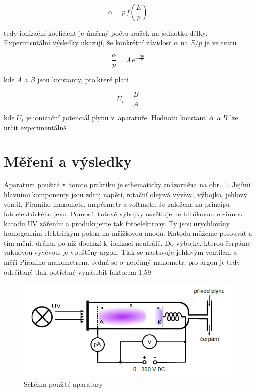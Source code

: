 \documentclass[a4paper,12pt]{article}
\newcommand{\e}{\text{e}}
\begin{document}
\begin{equation}
	\alpha = p\,f\left( \frac {E}{p} \right) 
	\label{4}
\end{equation}

tedy ionizační koeficient je úměrný počtu srážek na jednotku délky. Experimentální výsledky ukazují, že konkrétní závislost $\alpha$ na $E/p$ je ve tvaru

\begin{equation}
	\frac{\alpha}{p} = A\,\e^{-\frac{Bp}{E}} 
	\label{5}
\end{equation}

kde $A$ a $B$ jsou konstanty, pro které platí

\begin{equation}
	U_i = \frac{B}{A}
	\label{6}
\end{equation}

kde $U_i$ je ionizační potenciál plynu v~aparatuře. Hodnotu konstant $A$~a $B$ 
lze určit experimentálně.

\section{Měření a výsledky}

Aparatura použitá v~tomto praktiku je schematicky znázorněna na 
obr.~\ref{aparatura}. Jejími hlavními komponenty jsou zdroj napětí, rotační 
olejová vývěva, výbojka, jehlový ventil, Piraniho manometr, ampérmetr a 
voltmetr. Je založena na principu fotoelektrického jevu. Pomocí rtuťové výbojky 
osvětlujeme hliníkovou rovinnou katodu UV zářením a produkujeme tak 
fotoelektrony. Ty jsou urychlovány homogenním elektrickým polem na mřížkovou 
anodu. Katodu můžeme posouvat a tím měnit dráhu, po níž dochází k~ionizaci 
neutrálů. Do výbojky, kterou čerpáme vakuovou vývěvou, je vpuštěný argon. Tlak 
se nastavuje jehlovým ventilem a měří Piraniho manometrem. Jedná se o~nepřímý 
manometr, pro argon je tedy odečítaný tlak potřebné vynásobit 
faktorem 1,59.

\begin{figure}[h]
	\centering
	\includegraphics[width=130mm]{aparatura.png}
	\caption{Schéma použité aparatury}
	\label{aparatura}
\end{figure}
\end{document}
